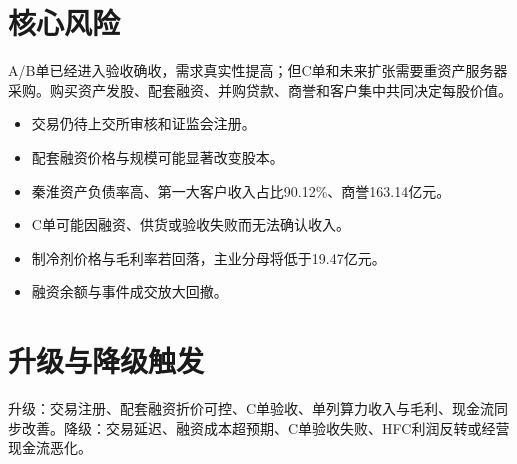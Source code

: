 \section{核心风险}

\begin{riskbox}
A/B单已经进入验收确收，需求真实性提高；但C单和未来扩张需要重资产服务器采购。购买资产发股、配套融资、并购贷款、商誉和客户集中共同决定每股价值。
\end{riskbox}

\begin{itemize}
  \item 交易仍待上交所审核和证监会注册。
  \item 配套融资价格与规模可能显著改变股本。
  \item 秦淮资产负债率高、第一大客户收入占比90.12\%、商誉163.14亿元。
  \item C单可能因融资、供货或验收失败而无法确认收入。
  \item 制冷剂价格与毛利率若回落，主业分母将低于19.47亿元。
  \item 融资余额与事件成交放大回撤。
\end{itemize}

\section{升级与降级触发}

升级：交易注册、配套融资折价可控、C单验收、单列算力收入与毛利、现金流同步改善。降级：交易延迟、融资成本超预期、C单验收失败、HFC利润反转或经营现金流恶化。
